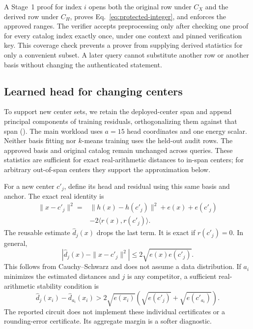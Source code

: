 A Stage~1 proof for index $i$ opens both the original row under $C_X$ and the derived row under $C_H$, proves Eq.~\eqref{eq:protected-integer}, and enforces the approved ranges. The verifier accepts preprocessing only after checking one proof for every catalog index exactly once, under one context and pinned verification key. This coverage check prevents a prover from supplying derived statistics for only a convenient subset. A later query cannot substitute another row or another basis without changing the authenticated statement.

\subsection{Learned head for changing centers}\label{sec:reuse}
To support new center sets, we retain the deployed-center span and append principal components of training residuals, orthogonalizing them against that span (). The main workload uses $a=15$ head coordinates and one energy scalar. Neither basis fitting nor $k$-means training uses the held-out audit rows. The approved basis and original catalog remain unchanged across queries. These statistics are sufficient for exact real-arithmetic distances to in-span centers; for arbitrary out-of-span centers they support the approximation below.

For a new center $c'_j$, define its head and residual using this same basis and anchor. The exact real identity is
\begin{align}
\|x-c'_j\|^2={}&\|h(x)-h(c'_j)\|^2+e(x)+e(c'_j)\nonumber\\
&-2\langle r(x),r(c'_j)\rangle.\label{eq:new-center-exact}
\end{align}
The reusable estimate $\widehat d_j(x)$ drops the last term. It is exact if $r(c'_j)=0$. In general,
\begin{equation}\label{eq:reuse-error}
|\widehat d_j(x)-\|x-c'_j\|^2|\le2\sqrt{e(x)e(c'_j)}.
\end{equation}
This follows from Cauchy--Schwarz and does not assume a data distribution. If $a_i$ minimizes the estimated distances and $j$ is any competitor, a sufficient real-arithmetic stability condition is
\begin{equation}\label{eq:reuse-certificate}
\widehat d_j(x_i)-\widehat d_{a_i}(x_i)>
2\sqrt{e(x_i)}\left(\sqrt{e(c'_j)}+\sqrt{e(c'_{a_i})}\right).
\end{equation}
The reported circuit does not implement these individual certificates or a rounding-error certificate. Its aggregate margin is a softer diagnostic.

